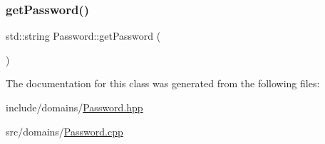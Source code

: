 \subsubsection{\texorpdfstring{getPassword()}{getPassword()}}
{\footnotesize\ttfamily std\+::string Password\+::get\+Password (\begin{DoxyParamCaption}{ }\end{DoxyParamCaption})}



The documentation for this class was generated from the following files\+:\begin{DoxyCompactItemize}
\item 
include/domains/\mbox{\hyperlink{_password_8hpp}{Password.\+hpp}}\item 
src/domains/\mbox{\hyperlink{_password_8cpp}{Password.\+cpp}}\end{DoxyCompactItemize}
